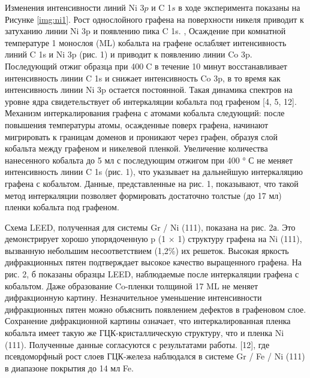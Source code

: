 Изменения интенсивности линий Ni 3$p$ и C 1$s$ в ходе эксперимента показаны на Рисунке \ref{img:ni1}. Рост однослойного графена на поверхности никеля приводит к затуханию линии Ni 3p и появлению пика C 1s. , Осаждение при комнатной температуре 1 монослоя (ML) кобальта на графене ослабляет интенсивность линий C 1s и Ni 3p (рис. 1) и приводит к появлению линии Co 3p. Последующий отжиг образца при 400C в течение 10 минут восстанавливает интенсивность линии C 1s и снижает интенсивность Co 3p, в то время как интенсивность линии Ni 3p остается постоянной. Такая динамика спектров на уровне ядра свидетельствует об интеркаляции кобальта под графеном [4, 5, 12]. Механизм интеркалирования графена с атомами кобальта следующий: после повышения температуры атомы, осажденные поверх графена, начинают мигрировать к границам доменов и проникают через графен, образуя слой кобальта между графеном и никелевой пленкой.
Увеличение количества нанесенного кобальта до 5 мл с последующим отжигом при 400 ° С не меняет интенсивность линии C 1s (рис. 1), что указывает на дальнейшую интеркаляцию графена с кобальтом. Данные, представленные на рис. 1, показывают, что такой метод интеркаляции позволяет формировать достаточно толстые (до 17 мл) пленки кобальта под графеном.

Схема LEED, полученная для системы Gr / Ni (111), показана на рис. 2а. Это демонстрирует хорошо упорядоченную p (1 × 1) структуру графена на Ni (111), вызванную небольшим несоответствием (1,2\%) их решеток. Высокая яркость дифракционных пятен подтверждает высокое качество выращенного графена. На рис. 2, б показаны образцы LEED, наблюдаемые после интеркаляции графена с кобальтом. Даже образование Co-пленки толщиной 17 ML не меняет дифракционную картину. Незначительное уменьшение интенсивности дифракционных пятен можно объяснить появлением дефектов в графеновом слое. Сохранение дифракционной картины означает, что интеркалированная пленка кобальта имеет такую же ГЦК-кристаллическую структуру, что и пленка Ni (111). Полученные данные согласуются с результатами работы. [12], где псевдоморфный рост слоев ГЦК-железа наблюдался в системе Gr / Fe / Ni (111) в диапазоне покрытия до 14 мл Fe. 

